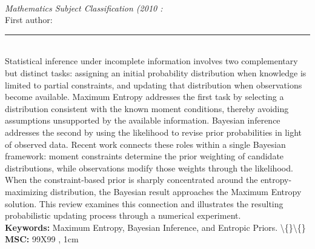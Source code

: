 \documentclass[10pt,twoside]{article}
\begin{document}
\noindent\begin{minipage}[t][\textheight]{\textwidth}
\\[0.35em]
{\itshape Mathematics Subject Classification (2010 :}\\[0.2em]
{\footnotesize First author: }\\[0.45em]
\noindent\rule{\textwidth}{0.3pt}\\[0.4em]
{\footnotesize  Statistical inference under incomplete information involves two complementary but distinct tasks: assigning an initial probability distribution when knowledge is limited to partial constraints, and updating that distribution when observations become available. Maximum Entropy addresses the first task by selecting a distribution consistent with the known moment conditions, thereby avoiding assumptions unsupported by the available information. Bayesian inference addresses the second by using the likelihood to revise prior probabilities in light of observed data. Recent work connects these roles within a single Bayesian framework: moment constraints determine the prior weighting of candidate distributions, while observations modify those weights through the likelihood. When the constraint-based prior is sharply concentrated around the entropy-maximizing distribution, the Bayesian result approaches the Maximum Entropy solution. This review examines this connection and illustrates the resulting probabilistic updating process through a numerical experiment.}\\[0.4em]
{\footnotesize\bfseries Keywords:} {\footnotesize Maximum Entropy, Bayesian Inference, and Entropic Priors. \textbackslash\{\}\textbackslash\{\}}\\[0.15em]
{\footnotesize\bfseries MSC:} {\footnotesize 99X99 , 1cm}\\
\vfill
\end{minipage}
\newpage
\end{document}

